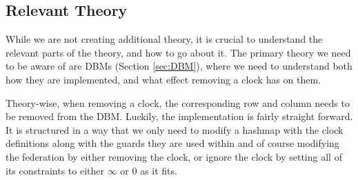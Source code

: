 \subsection{Relevant Theory}
While we are not creating additional theory, it is crucial to understand the relevant parts of the theory, and how to go about it. The primary theory we need to be aware of are DBMs (Section \ref{sec:DBM}), where we need to understand both how they are implemented, and what effect removing a clock has on them.

Theory-wise, when removing a clock, the corresponding row and column needs to be removed from the DBM. Luckily, the implementation is fairly straight forward. It is structured in a way that we only need to modify a hashmap with the clock definitions along with the guards they are used within and of course modifying the federation by either removing the clock, or ignore the clock by setting all of its constraints to either $\infty$ or $0$ as it fits.





